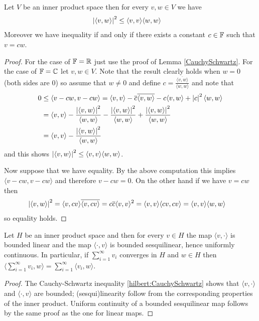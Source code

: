 \begin{prop}\label{hilbert:CauchySchwartz}Let $V$ be an inner product space then for every $v, w \in V$ we have
\begin{align*}
\left \vert \langle v, w \rangle \right \vert^2 &\leq \langle v,v \rangle \langle w,w \rangle
\end{align*}
Moreover we have inequality if and only if there exists a constant $c \in \mathbb{F}$ such that $v = c w$.
\end{prop}
\begin{proof}
For the case of $\mathbb{F} = \mathbb{R}$ just use the proof of Lemma \ref{CauchySchwartz}.  For the case of $\mathbb{F} = \mathbb{C}$ let $v, w \in V$.  Note that the result clearly holds when $w=0$ (both sides are $0$) so assume that $w \neq 0$ and define $c = \frac{\overline{\langle v, w \rangle}}{\langle w, w \rangle}$ and note that
\begin{align*}
0 &\leq \langle v - c w , v - c w \rangle = \langle v, v \rangle - \overline{c} \overline{\langle v, w \rangle} - c \langle v, w \rangle + \left \vert c \right \vert^2 \langle w, w \rangle \\
&= \langle v, v \rangle - \frac{\left \vert \langle v, w \rangle \right \vert^2}{\langle w, w \rangle} - \frac{\left \vert \langle v, w \rangle \right \vert^2}{\langle w, w \rangle} + \frac{\left \vert \langle v, w \rangle \right \vert^2}{\langle w, w \rangle}  \\
&=\langle v, v \rangle - \frac{\left \vert \langle v, w \rangle \right \vert^2}{\langle w, w \rangle}
\end{align*}
and this shows $\left \vert \langle v, w \rangle \right \vert^2 \leq \langle v,v \rangle \langle w,w \rangle$.

Now suppose that we have equality.  By the above computation this implies $\langle v - c w , v - c w \rangle$ and therefore $v - cw =0$.  On the other hand if we have $v = cw$ then
\begin{align*}
\left \vert \langle v, w \rangle \right \vert^2 &=  \langle v, c v \rangle \overline{\langle  v, c v \rangle} = c \overline{c} \langle v, v \rangle^2 = \langle v, v \rangle \langle cv, cv \rangle 
= \langle v, v \rangle \langle w, w \rangle
\end{align*}
so equality holds.
\end{proof}

\begin{prop}\label{hilbert:ContinuityOfInnerProduct}Let $H$ be an inner product space and then for every $v \in H$ the map $\langle v, \cdot \rangle$ is bounded linear and the map $\langle \cdot, v \rangle$ is bounded sesquilinear, hence uniformly continuous.  In particular, if $\sum_{i=1}^\infty v_i$ converges in $H$ and $w \in H$ then $\langle \sum_{i=1}^\infty v_i, w \rangle=\sum_{i=1}^\infty \langle v_i, w \rangle$.
\end{prop}
\begin{proof}
The Cauchy-Schwartz inequality \ref{hilbert:CauchySchwartz} shows that $\langle v, \cdot \rangle$ and $\langle \cdot, v \rangle$ are bounded; (sesqui)linearity follow from the corresponding properties of the inner product.  Uniform continuity of a bounded sesquilinear map follows by the same proof as the one for linear maps.
\end{proof}

